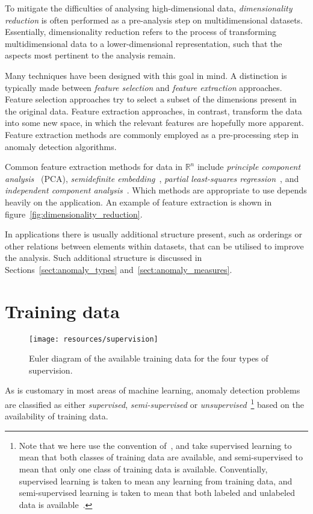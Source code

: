 To mitigate the difficulties of analysing high-dimensional data, \emph{dimensionality reduction} is often performed as a pre-analysis step on multidimensional datasets. Essentially, dimensionality reduction refers to the process of transforming multidimensional data to a lower-dimensional representation, such that the aspects most pertinent to the analysis remain.

Many techniques have been designed with this goal in mind. A distinction is typically made between \emph{feature selection} and \emph{feature extraction} approaches. Feature selection approaches try to select a subset of the dimensions present in the original data. Feature extraction approaches, in contrast, transform the data into some new space, in which the relevant features are hopefully more apparent. Feature extraction methods are commonly employed as a pre-processing step in anomaly detection algorithms.

Common feature extraction methods for data in $\mathbb{R}^n$ include \emph{principle component analysis}~\cite{TODO} (PCA), \emph{semidefinite embedding}~\cite{TODO}, \emph{partial least-squares regression}~\cite{TODO}, and \emph{independent component analysis}~\cite{TODO}. Which methods are appropriate to use depends heavily on the application. An example of feature extraction is shown in figure~\ref{fig:dimensionality_reduction}.

In applications there is usually additional structure present, such as orderings or other relations between elements within datasets, that can be utilised to improve the analysis. Such additional structure is discussed in Sections~\ref{sect:anomaly_types} and~\ref{sect:anomaly_measures}.

\section{Training data}
\label{sect:training_data}

\begin{wrapfigure}{r}{0.5\textwidth}
    \centering
    \texttt{[image: resources/supervision]}
    \caption{{\small Euler diagram of the available training data for the four types of supervision.}}
\label{fig:supervision}
\end{wrapfigure}

As is customary in most areas of machine learning, anomaly detection problems are classified as either \emph{supervised}, \emph{semi-supervised} or \emph{unsupervised}~\footnote{Note that we here use the convention of~\cite{chandola}, and take supervised learning to mean that both classes of training data are available, and semi-supervised to mean that only one class of training data is available. Conventially, supervised learning is taken to mean any learning from training data, and semi-supervised learning is taken to mean that both labeled and unlabeled data is available~\cite{TODO}.} based on the availability of training data.

